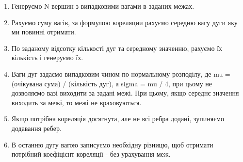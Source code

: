 \begin{enumerate}
    \item Генеруємо N вершин з випадковими вагами в заданих межах.
    \item Рахуємо суму вагів, за формулою кореляции рахуємо середню вагу дуги яку ми повинні отримати.
    \item По заданому відсотку кількості дуг та середному значенню, рахуємо їх кількість і генеруємо їх.
    \item Ваги дуг задаємо випадковим чином по нормальному розподілу, де mu = (очікувана сума) / (кількість дуг), а sigma = mu / 4, при цьому не дозволяємо вазі виходити за задані межі. При цьому, якщо середнє значення виходить за межі, то межі не враховуються.
    \item Якщо потрібна кореляція досягнута, але не всі ребра додані, зупиняємо додавання ребер.
    \item В останню дугу вагою записуємо необхідну різницю, щоб отримати потрібний коефіцієнт кореляції - без урахування меж.
\end{enumerate}

